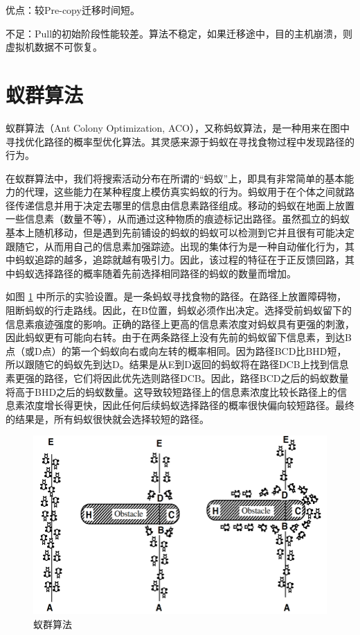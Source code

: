 优点：较Pre-copy迁移时间短。

不足：Pull的初始阶段性能较差。算法不稳定，如果迁移途中，目的主机崩溃，则虚拟机数据不可恢复。

\section{蚁群算法}
蚁群算法（Ant Colony Optimization, ACO），又称蚂蚁算法，是一种用来在图中寻找优化路径的概率型优化算法。其灵感来源于蚂蚁在寻找食物过程中发现路径的行为\cite{Maniezzo}。

在蚁群算法中，我们将搜索活动分布在所谓的“蚂蚁”上，即具有非常简单的基本能力的代理，这些能力在某种程度上模仿真实蚂蚁的行为。蚂蚁用于在个体之间就路径传递信息并用于决定去哪里的信息由信息素路径组成。移动的蚂蚁在地面上放置一些信息素（数量不等），从而通过这种物质的痕迹标记出路径。虽然孤立的蚂蚁基本上随机移动，但是遇到先前铺设的蚂蚁的蚂蚁可以检测到它并且很有可能决定跟随它，从而用自己的信息素加强踪迹。出现的集体行为是一种自动催化行为，其中蚂蚁追踪的越多，追踪就越有吸引力。因此，该过程的特征在于正反馈回路，其中蚂蚁选择路径的概率随着先前选择相同路径的蚂蚁的数量而增加。

如图 \ref{Fig:chap2_4} 中所示的实验设置。是一条蚂蚁寻找食物的路径。在路径上放置障碍物，阻断蚂蚁的行走路线。因此，在B位置，蚂蚁必须作出决定。选择受前蚂蚁留下的信息素痕迹强度的影响。正确的路径上更高的信息素浓度对蚂蚁具有更强的刺激，因此蚂蚁更有可能向右转。由于在两条路径上没有先前的蚂蚁留下信息素，到达B点（或D点）的第一个蚂蚁向右或向左转的概率相同。因为路径BCD比BHD短，所以跟随它的蚂蚁先到达D。结果是从E到D返回的蚂蚁将在路径DCB上找到信息素更强的路径，它们将因此优先选则路径DCB。因此，路径BCD之后的蚂蚁数量将高于BHD之后的蚂蚁数量。这导致较短路径上的信息素浓度比较长路径上的信息素浓度增长得更快，因此任何后续蚂蚁选择路径的概率很快偏向较短路径。最终的结果是，所有蚂蚁很快就会选择较短的路径。

\begin{figure}[htb]
  \centering
  \includegraphics{./Figure/IMG_Chap2_4.png}
  \caption{蚁群算法}\label{Fig:chap2_4}
\end{figure}

